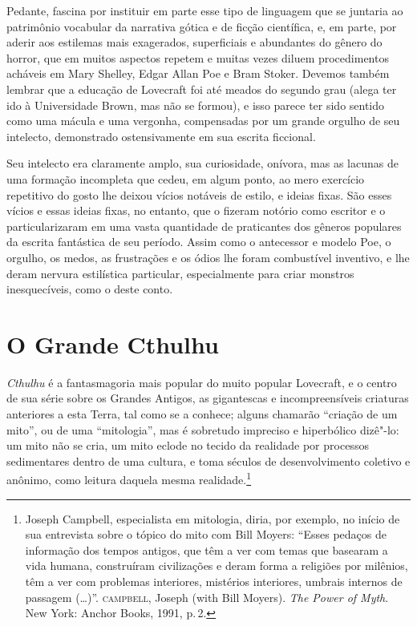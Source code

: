 Pedante, fascina por instituir em parte esse tipo de linguagem que se
juntaria ao patrimônio vocabular da narrativa gótica e de ficção
científica, e, em parte, por aderir aos estilemas mais exagerados,
superficiais e abundantes do gênero do horror, que em muitos aspectos
repetem e muitas vezes diluem procedimentos acháveis em Mary Shelley,
Edgar Allan Poe e Bram Stoker. Devemos também lembrar que a educação de
Lovecraft foi até meados do segundo grau (alega ter ido à Universidade
Brown, mas não se formou), e isso parece ter sido sentido como uma
mácula e uma vergonha, compensadas por um grande orgulho de seu
intelecto, demonstrado ostensivamente em sua escrita ficcional.

Seu intelecto era claramente amplo, sua curiosidade, onívora, mas as
lacunas de uma formação incompleta que cedeu, em algum ponto, ao mero
exercício repetitivo do gosto lhe deixou vícios notáveis de estilo, e
ideias fixas. São esses vícios e essas ideias fixas, no entanto, que o
fizeram notório como escritor e o particularizaram em uma vasta
quantidade de praticantes dos gêneros populares da escrita fantástica de
seu período. Assim como o antecessor e modelo Poe, o orgulho, os medos,
as frustrações e os ódios lhe foram combustível inventivo, e lhe deram
nervura estilística particular, especialmente para criar monstros
inesquecíveis, como o deste conto.

\section{O Grande Cthulhu}

\emph{Cthulhu} é a fantasmagoria mais popular do muito popular
Lovecraft, e o centro de sua série sobre os Grandes Antigos, as
gigantescas e incompreensíveis criaturas anteriores a esta Terra, tal
como se a conhece; alguns chamarão ``criação de um mito'', ou de uma
``mitologia'', mas é sobretudo impreciso e hiperbólico dizê"-lo: um mito
não se cria, um mito eclode no tecido da realidade por processos
sedimentares dentro de uma cultura, e toma séculos de desenvolvimento
coletivo e anônimo, como leitura daquela mesma realidade.\footnote{Joseph
  Campbell, especialista em mitologia, diria, por exemplo, no início de
  sua entrevista sobre o tópico do mito com Bill Moyers: ``Esses pedaços
  de informação dos tempos antigos, que têm a ver com temas que basearam
  a vida humana, construíram civilizações e deram forma a religiões por
  milênios, têm a ver com problemas interiores, mistérios interiores,
  umbrais internos de passagem (\ldots{})''. \textsc{campbell}, Joseph (with Bill
  Moyers). \emph{The Power of Myth}. New York: Anchor Books, 1991, p.\,2.}

